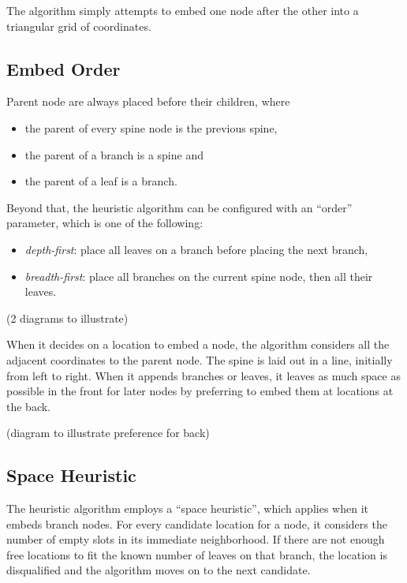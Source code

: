 \documentclass[draft,final]{vutinfth} %
\begin{document}
The algorithm simply attempts to embed one node after the other into a triangular grid of coordinates.

\subsection{Embed Order}

Parent node are always placed before their children, where

\begin{itemize}
    \item the parent of every spine node is the previous spine,
    \item the parent of a branch is a spine and
    \item the parent of a leaf is a branch.
\end{itemize}

Beyond that, the heuristic algorithm can be configured with an ``order'' parameter, which is one of the following:

\begin{itemize}
    \item \emph{depth-first}: place all leaves on a branch before placing the next branch,
    \item \emph{breadth-first}: place all branches on the current spine node, then all their leaves.
\end{itemize}

(2 diagrams to illustrate)

When it decides on a location to embed a node, the algorithm considers all the adjacent coordinates to the parent node.
The spine is laid out in a line, initially from left to right.
When it appends branches or leaves, it leaves as much space as possible in the front for later nodes by preferring to embed them at locations at the back.

(diagram to illustrate preference for back)

\subsection{Space Heuristic}

The heuristic algorithm employs a ``space heuristic'', which applies when it embeds branch nodes.
For every candidate location for a node, it considers the number of empty slots in its immediate neighborhood. If there are not enough free locations to fit the known number of leaves on that branch, the location is disqualified and the algorithm moves on to the next candidate.
\end{document}
